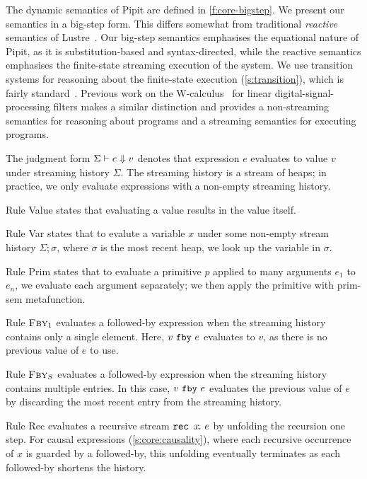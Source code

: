\documentclass[a4paper,UKenglish,cleveref, autoref, thm-restate,anonymous]{lipics-v2021}
\begin{document}
The dynamic semantics of Pipit are defined in \autoref{f:core-bigstep}.
We present our semantics in a big-step form.
This differs somewhat from traditional \emph{reactive} semantics of Lustre~\cite{caspi1995functional}.
Our big-step semantics emphasises the equational nature of Pipit, as it is substitution-based and syntax-directed, while the reactive semantics emphasises the finite-state streaming execution of the system.
We use transition systems for reasoning about the finite-state execution (\autoref{s:transition}), which is fairly standard~\cite{brun2023equation,champion2016kind2,raymond2008synchronous}.
Previous work on the {\sc W-calculus}~\cite{gallego2021w} for linear digital-signal-processing filters makes a similar distinction and provides a non-streaming semantics for reasoning about programs and a streaming semantics for executing programs.


The judgment form $\Sigma \vdash e \Downarrow v$ denotes that expression $e$ evaluates to value $v$ under streaming history $\Sigma$.
The streaming history is a stream of heaps; in practice, we only evaluate expressions with a non-empty streaming history.

Rule {\sc Value} states that evaluating a value results in the value itself.

Rule {\sc Var} states that to evalute a variable $x$ under some non-empty stream history $\Sigma; \sigma$, where $\sigma$ is the most recent heap, we look up the variable in $\sigma$.

Rule {\sc Prim} states that to evaluate a primitive $p$ applied to many arguments $e_1$ to $e_n$, we evaluate each argument separately; we then apply the primitive with prim-sem metafunction.

Rule $\textsc{Fby}_1$ evaluates a followed-by expression when the streaming history contains only a single element.
Here, $v~\texttt{fby}~e$ evaluates to $v$, as there is no previous value of $e$ to use.

Rule $\textsc{Fby}_S$ evaluates a followed-by expression when the streaming history contains multiple entries.
In this case, $v~\texttt{fby}~e$ evaluates the previous value of $e$ by discarding the most recent entry from the streaming history.

Rule {\sc Rec} evaluates a recursive stream $\texttt{rec~} x\hspace{-0.1em}.~e$ by unfolding the recursion one step.
For causal expressions (\autoref{s:core:causality}), where each recursive occurrence of $x$ is guarded by a followed-by, this unfolding eventually terminates as each followed-by shortens the history.
\end{document}
